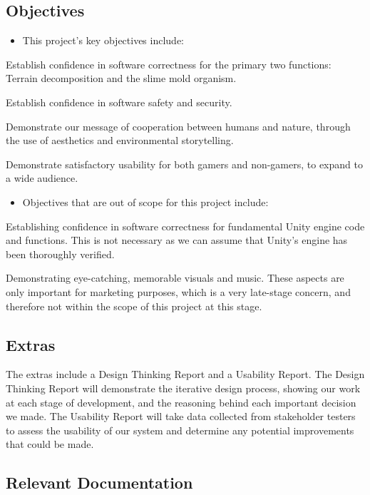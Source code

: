 \documentclass[12pt, titlepage]{article}
\begin{document}
\subsection{Objectives}

\begin{itemize}
  \item This project’s key objectives include:
\end{itemize}

Establish confidence in software correctness for the primary two functions: Terrain decomposition and the slime mold organism.

Establish confidence in software safety and security.

Demonstrate our message of cooperation between humans and nature, through the use of aesthetics and environmental storytelling.

Demonstrate satisfactory usability for both gamers and non-gamers, to expand to a wide audience.

\begin{itemize}
  \item Objectives that are out of scope for this project include:
\end{itemize}

Establishing confidence in software correctness for fundamental Unity engine code and functions. This is not necessary as we can assume that Unity’s engine has been thoroughly verified.

Demonstrating eye-catching, memorable visuals and music. These aspects are only important for marketing purposes, which is a very late-stage concern, and therefore not within the scope of this project at this stage.

\subsection{Extras}

The extras include a Design Thinking Report and a Usability Report. The Design Thinking Report will demonstrate the iterative design process, showing our work at each stage of development, and the reasoning behind each important decision we made. The Usability Report will take data collected from stakeholder testers to assess the usability of our system and determine any potential improvements that could be made.

\subsection{Relevant Documentation}
\end{document}
